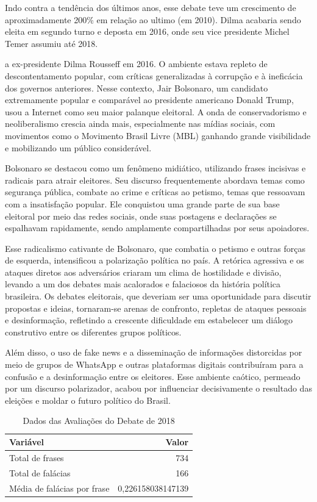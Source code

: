 \documentclass[12pt]{article}
\begin{document}
Indo contra a tendência dos últimos anos, esse debate teve um crescimento de aproximadamente 200\% em relação ao ultimo (em 2010). Dilma acabaria sendo eleita em segundo turno e deposta em 2016, onde seu vice presidente Michel Temer assumiu até 2018.

a ex-presidente Dilma Rousseff em 2016. O ambiente estava repleto de descontentamento popular, com críticas generalizadas à corrupção e à ineficácia dos governos anteriores. Nesse contexto, Jair Bolsonaro, um candidato extremamente popular e comparável ao presidente americano Donald Trump, usou a Internet como seu maior palanque eleitoral. A onda de conservadorismo e neoliberalismo crescia ainda mais, especialmente nas mídias sociais, com movimentos como o Movimento Brasil Livre (MBL) ganhando grande visibilidade e mobilizando um público considerável.

Bolsonaro se destacou como um fenômeno midiático, utilizando frases incisivas e radicais para atrair eleitores. Seu discurso frequentemente abordava temas como segurança pública, combate ao crime e críticas ao petismo, temas que ressoavam com a insatisfação popular. Ele conquistou uma grande parte de sua base eleitoral por meio das redes sociais, onde suas postagens e declarações se espalhavam rapidamente, sendo amplamente compartilhadas por seus apoiadores.

Esse radicalismo cativante de Bolsonaro, que combatia o petismo e outras forças de esquerda, intensificou a polarização política no país. A retórica agressiva e os ataques diretos aos adversários criaram um clima de hostilidade e divisão, levando a um dos debates mais acalorados e falaciosos da história política brasileira. Os debates eleitorais, que deveriam ser uma oportunidade para discutir propostas e ideias, tornaram-se arenas de confronto, repletas de ataques pessoais e desinformação, refletindo a crescente dificuldade em estabelecer um diálogo construtivo entre os diferentes grupos políticos.

Além disso, o uso de fake news e a disseminação de informações distorcidas por meio de grupos de WhatsApp e outras plataformas digitais contribuíram para a confusão e a desinformação entre os eleitores. Esse ambiente caótico, permeado por um discurso polarizador, acabou por influenciar decisivamente o resultado das eleições e moldar o futuro político do Brasil.

\begin{table}[ht]
\centering
\caption{Dados das Avaliações do Debate de 2018}
\label{tab:exTable1}
\begin{tabular}{l r}
\hline
\textbf{Variável} & \textbf{Valor} \\
\hline
Total de frases & 734 \\
Total de falácias & 166 \\
Média de falácias por frase & 0,226158038147139 \\
\hline
\end{tabular}
\end{table}
\end{document}
